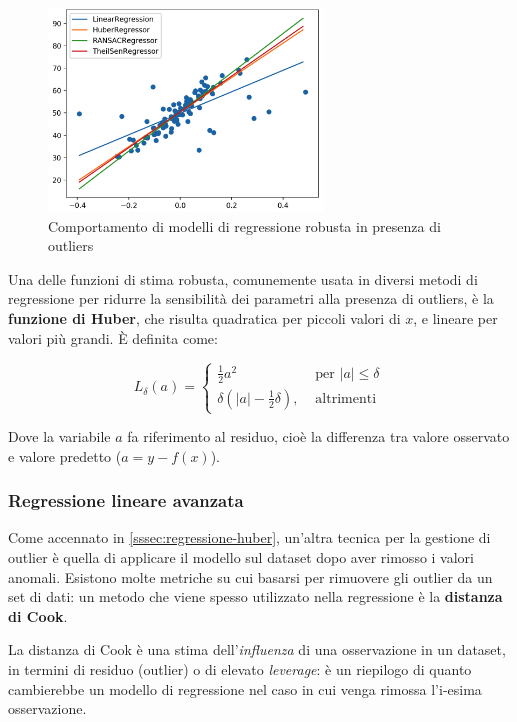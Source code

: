 \begin{figure}[H]
\centering
\includegraphics[width=0.65\textwidth,height=\textheight,keepaspectratio]{img/robust.png}
\caption{Comportamento di modelli di regressione robusta in presenza di outliers}
\label{fig:reg_rob}
\end{figure}

Una delle funzioni di stima robusta, comunemente usata in diversi metodi di regressione per ridurre la sensibilità dei parametri alla presenza di outliers, è la \textbf{funzione di Huber}, che risulta quadratica per piccoli valori di $x$, e lineare per valori più grandi. È definita come:

$$L_{\delta}(a)= \begin{cases}\frac{1}{2} a^{2} & \text { per }|a| \leq \delta \\ \delta\left(|a|-\frac{1}{2} \delta\right), & \text { altrimenti }\end{cases}$$\smallskip

Dove la variabile $a$ fa riferimento al residuo, cioè la differenza tra valore osservato e valore predetto ($a = y - f(x)$).


\subsubsection{Regressione lineare avanzata}\label{sssec:regressione-cook}
Come accennato in \ref{sssec:regressione-huber}, un'altra tecnica per la gestione di outlier è quella di applicare il modello sul dataset dopo aver rimosso i valori anomali. Esistono molte metriche su cui basarsi per rimuovere gli outlier da un set di dati: un metodo che viene spesso utilizzato nella regressione è la \textbf{distanza di Cook}.

La distanza di Cook è una stima dell'\textit{influenza} di una osservazione in un dataset, in termini di residuo (outlier) o di elevato \textit{leverage}: è un riepilogo di quanto cambierebbe un modello di regressione nel caso in cui venga rimossa l'i-esima osservazione.

